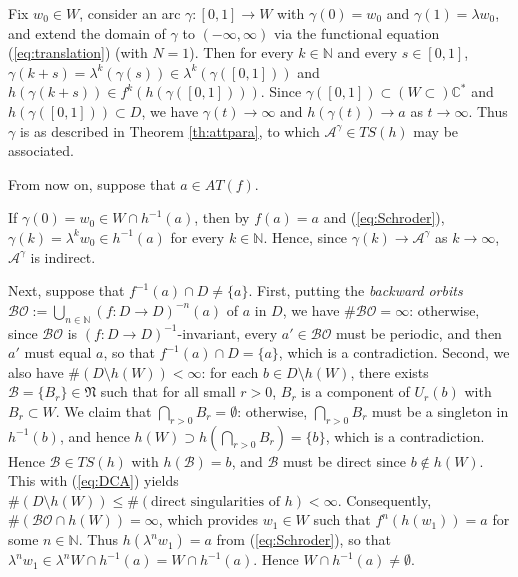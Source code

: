 \documentclass[a4paper,12pt]{amsart}
\theoremstyle{plain}
\theoremstyle{definition}
\theoremstyle{remark}
\numberwithin{equation}{section}
\begin{document}
Fix $w_0\in W$, consider an arc $\gamma:[0,1]\to W$
with $\gamma(0)=w_0$ and $\gamma(1)=\lambda w_0$, and
extend the domain of $\gamma$ to $(-\infty,\infty)$ via the functional equation
(\ref{eq:translation}) (with $N=1$). Then for every $k\in{\mathbb{N}}$ and every $s\in[0,1]$,
$\gamma(k+s)=\lambda^k(\gamma(s))\in\lambda^k(\gamma([0,1]))$
and $h(\gamma(k+s))\in f^k(h(\gamma([0,1])))$. 
Since $\gamma([0,1])\subset(W\subset){\mathbb{C}}^*$ and $h(\gamma([0,1]))\subset D$,
we have $\gamma(t)\to\infty$ and $h(\gamma(t))\to a$ as $t\to\infty$.
Thus $\gamma$ is as described in Theorem \ref{th:attpara},
to which $\mathcal{A}^{\gamma}\in{\mathit{TS}}(h)$ may be associated.

From now on, suppose that $a\in{\mathit{AT}}(f)$.

If $\gamma(0)=w_0\in W\cap h^{-1}(a)$, then by $f(a)=a$ and
(\ref{eq:Schroder}), $\gamma(k)=\lambda^kw_0\in h^{-1}(a)$ for every $k\in{\mathbb{N}}$.
Hence, since $\gamma(k)\to\mathcal{A}^{\gamma}$ as $k\to\infty$,
$\mathcal{A}^{\gamma}$ is indirect.

Next, suppose that $f^{-1}(a)\cap D\neq\{a\}$. 
First, putting the {\itshape backward orbits}
$\mathcal{BO}:=\bigcup_{n\in{\mathbb{N}}}(f:D\to D)^{-n}(a)$ of $a$ in $D$, 
we have $\#\mathcal{BO}=\infty$: otherwise,
since $\mathcal{BO}$ is $(f:D\to D)^{-1}$-invariant,
every $a'\in\mathcal{BO}$ must be periodic, and then $a'$ must equal $a$,
so that $f^{-1}(a)\cap D=\{a\}$, which is a contradiction.
Second, we also have $\#(D\setminus h(W))<\infty$:
for each $b\in D\setminus h(W)$, there exists $\mathcal{B}=\{B_r\}\in\mathfrak{N}$
such that for all small $r>0$, $B_r$ is a component of $U_r(b)$ with $B_r\subset W$.
We claim that $\bigcap_{r>0}B_r=\emptyset$:
otherwise, $\bigcap_{r>0}B_r$ must be a singleton
in $h^{-1}(b)$, and hence $h(W)\supset h(\bigcap_{r>0}B_r)=\{b\}$,
which is a contradiction. Hence $\mathcal{B}\in{\mathit{TS}}(h)$ with $h(\mathcal{B})=b$,
and $\mathcal{B}$ must be direct since $b\not\in h(W)$. 
This with (\ref{eq:DCA}) 
yields $\#(D\setminus h(W))\le\#(\text{direct singularities of }h)<\infty$.
Consequently, $\#(\mathcal{BO}\cap h(W))=\infty$,
which provides $w_1\in W$ such that $f^n(h(w_1))=a$ for some $n\in{\mathbb{N}}$.
Thus $h(\lambda^nw_1)=a$ from (\ref{eq:Schroder}), so that
$\lambda^nw_1\in \lambda^nW\cap h^{-1}(a)=W\cap h^{-1}(a)$. 
Hence $W\cap h^{-1}(a)\neq\emptyset$. 
\end{document}
